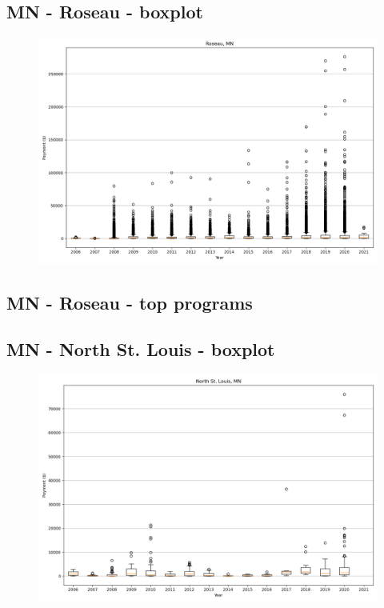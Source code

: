 \subsection*{MN - Roseau - boxplot}
\begin{figure}[h]
\centering
\includegraphics[width=7in]{../output/boxplots/counties/Roseau-MN_boxplot.png}
\end{figure}


\subsection*{MN - Roseau - top programs}

\newpage
\subsection*{MN - North St. Louis - boxplot}
\begin{figure}[h]
\centering
\includegraphics[width=7in]{../output/boxplots/counties/North St. Louis-MN_boxplot.png}
\end{figure}


